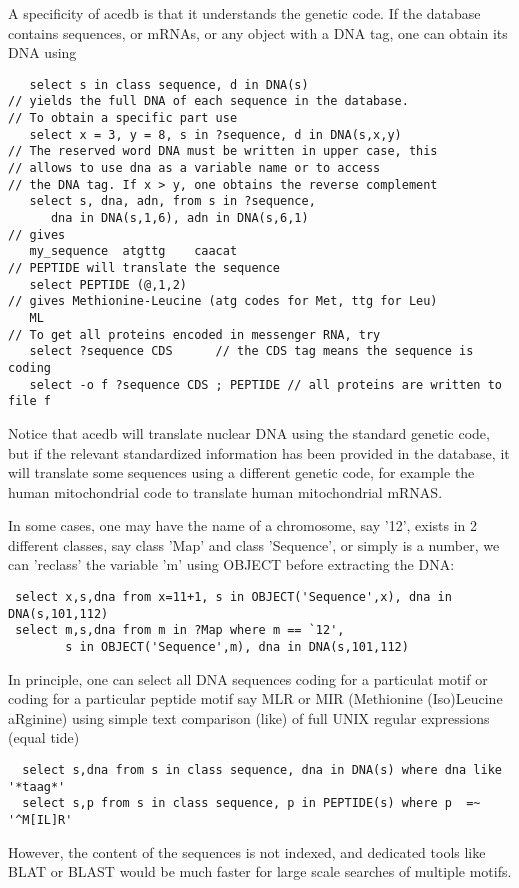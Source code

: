 \documentclass[11pt]{article}
\newcommand{\BL}{\begin{lstlisting}}
\begin{document}
A specificity of acedb is that it understands the genetic code. If the database contains sequences, or mRNAs, 
or any object with a DNA tag, one can obtain its DNA using
\BL
   select s in class sequence, d in DNA(s)
// yields the full DNA of each sequence in the database. 
// To obtain a specific part use
   select x = 3, y = 8, s in ?sequence, d in DNA(s,x,y)   
// The reserved word DNA must be written in upper case, this
// allows to use dna as a variable name or to access 
// the DNA tag. If x > y, one obtains the reverse complement
   select s, dna, adn, from s in ?sequence, 
      dna in DNA(s,1,6), adn in DNA(s,6,1)
// gives
   my_sequence  atgttg    caacat
// PEPTIDE will translate the sequence 
   select PEPTIDE (@,1,2)
// gives Methionine-Leucine (atg codes for Met, ttg for Leu)
   ML
// To get all proteins encoded in messenger RNA, try
   select ?sequence CDS      // the CDS tag means the sequence is coding
   select -o f ?sequence CDS ; PEPTIDE // all proteins are written to file f
\end{lstlisting}
Notice that acedb will translate nuclear DNA using the standard genetic code, 
but if the relevant standardized information has been provided in the database,
it will translate some sequences using a different genetic code,
for example the human mitochondrial code to translate human mitochondrial mRNAS.

In some cases, one may have the name of a chromosome, say '12', exists in 2 different classes,
say class 'Map' and class 'Sequence', or simply is a number, 
we can 'reclass' the  variable 'm' using OBJECT before extracting the DNA:
\BL
 select x,s,dna from x=11+1, s in OBJECT('Sequence',x), dna in DNA(s,101,112)
 select m,s,dna from m in ?Map where m == `12',
        s in OBJECT('Sequence',m), dna in DNA(s,101,112)
\end{lstlisting}


In principle, one can select all DNA sequences coding for a particulat motif
or coding for a particular peptide motif
say MLR or MIR (Methionine (Iso)Leucine aRginine) using
simple text comparison (like) of full UNIX
regular expressions (equal tide)
\BL
  select s,dna from s in class sequence, dna in DNA(s) where dna like '*taag*'
  select s,p from s in class sequence, p in PEPTIDE(s) where p  =~ '^M[IL]R'
\end{lstlisting}
However, the content of the sequences is not indexed, and dedicated tools
like BLAT or BLAST would be much faster for large scale searches
of multiple motifs.

\end{document}
